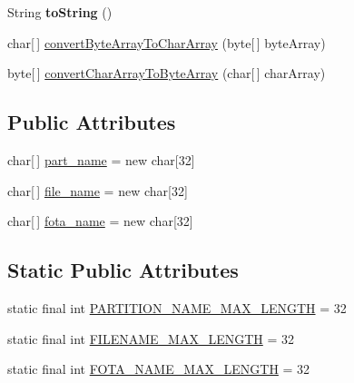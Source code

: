 \begin{DoxyCompactItemize}
\item 
\hypertarget{classCASUAL_1_1archiving_1_1libpit_1_1PitEntry_afc3393197ca61b33f848473150b26221}{String {\bfseries to\-String} ()}\label{classCASUAL_1_1archiving_1_1libpit_1_1PitEntry_afc3393197ca61b33f848473150b26221}

\item 
char\mbox{[}$\,$\mbox{]} \hyperlink{classCASUAL_1_1archiving_1_1libpit_1_1PitEntry_a1bd37b3058a9be2b40c288d23aefbf73}{convert\-Byte\-Array\-To\-Char\-Array} (byte\mbox{[}$\,$\mbox{]} byte\-Array)
\item 
byte\mbox{[}$\,$\mbox{]} \hyperlink{classCASUAL_1_1archiving_1_1libpit_1_1PitEntry_a905bd7899229d0c728e5a41d17eccd6e}{convert\-Char\-Array\-To\-Byte\-Array} (char\mbox{[}$\,$\mbox{]} char\-Array)
\end{DoxyCompactItemize}
\subsection*{Public Attributes}
\begin{DoxyCompactItemize}
\item 
char\mbox{[}$\,$\mbox{]} \hyperlink{classCASUAL_1_1archiving_1_1libpit_1_1PitEntry_a8b20459af269e6d4b662e4ffa7be7797}{part\-\_\-name} = new char\mbox{[}32\mbox{]}
\item 
char\mbox{[}$\,$\mbox{]} \hyperlink{classCASUAL_1_1archiving_1_1libpit_1_1PitEntry_a7388f05175e0ce987837143a20c001b8}{file\-\_\-name} = new char\mbox{[}32\mbox{]}
\item 
char\mbox{[}$\,$\mbox{]} \hyperlink{classCASUAL_1_1archiving_1_1libpit_1_1PitEntry_aba9afd6f46bd79aa19fb5f164751765f}{fota\-\_\-name} = new char\mbox{[}32\mbox{]}
\end{DoxyCompactItemize}
\subsection*{Static Public Attributes}
\begin{DoxyCompactItemize}
\item 
static final int \hyperlink{classCASUAL_1_1archiving_1_1libpit_1_1PitEntry_a68d48bb252739f2bb2ce5592ee3667ea}{P\-A\-R\-T\-I\-T\-I\-O\-N\-\_\-\-N\-A\-M\-E\-\_\-\-M\-A\-X\-\_\-\-L\-E\-N\-G\-T\-H} = 32
\item 
static final int \hyperlink{classCASUAL_1_1archiving_1_1libpit_1_1PitEntry_a81ebbe2ebf57d0f3a816850fcb70fb47}{F\-I\-L\-E\-N\-A\-M\-E\-\_\-\-M\-A\-X\-\_\-\-L\-E\-N\-G\-T\-H} = 32
\item 
static final int \hyperlink{classCASUAL_1_1archiving_1_1libpit_1_1PitEntry_a4f20eef186c9d552cba274803b7d2b1b}{F\-O\-T\-A\-\_\-\-N\-A\-M\-E\-\_\-\-M\-A\-X\-\_\-\-L\-E\-N\-G\-T\-H} = 32
\end{DoxyCompactItemize}


